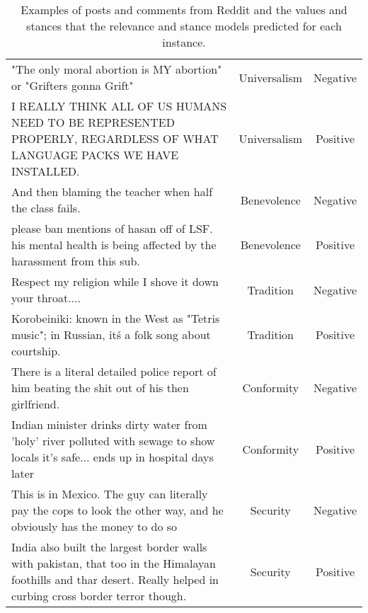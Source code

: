 \begin{table*}
{\begin{tabular}{p{12cm}cc}
"The only moral abortion is MY abortion" or "Grifters gonna Grift" & Universalism & Negative \\
I REALLY THINK ALL OF US HUMANS NEED TO BE REPRESENTED PROPERLY, REGARDLESS OF WHAT LANGUAGE PACKS WE HAVE INSTALLED. & Universalism & Positive \\
And then blaming the teacher when half the class fails. & Benevolence & Negative \\
please ban mentions of hasan off of LSF. his mental health is being affected by the harassment from this sub.	& Benevolence & Positive \\
Respect my religion while I shove it down your throat.... & Tradition & Negative \\
Korobeiniki: known in the West as "Tetris music"; in Russian, it\'s a folk song about courtship. & Tradition & Positive \\
There is a literal detailed police report of him beating the shit out of his then girlfriend.	& Conformity & Negative \\
Indian minister drinks dirty water from 'holy' river polluted with sewage to show locals it's safe... ends up in hospital days later & Conformity & Positive \\
This is in Mexico. The guy can literally pay the cops to look the other way, and he obviously has the money to do so & Security & Negative \\
India also built the largest border walls with pakistan, that too in the Himalayan foothills and thar desert. Really helped in curbing cross border terror though. & Security & Positive \\

 \bottomrule
 \end{tabular}
}
\caption{Examples of posts and comments from Reddit and the values and stances that the relevance and stance models predicted for each instance.}
\label{tab:posts_examples}
\end{table*}
